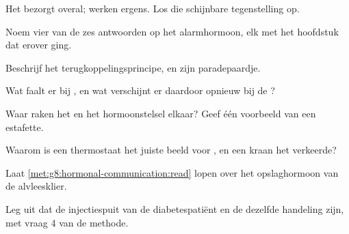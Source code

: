 \begin{exercise}[$\star$]\label{exo:g8:hormonal-communication:2}
Het  bezorgt overal;  werken ergens. Los die schijnbare
tegenstelling op.
\end{exercise}

\begin{exercise}[$\star$]\label{exo:g8:hormonal-communication:3}
Noem vier van de zes antwoorden op het alarmhormoon, elk met het
hoofdstuk dat erover ging.
\end{exercise}

\begin{exercise}[$\star$]\label{exo:g8:hormonal-communication:4}
Beschrijf het terugkoppelingsprincipe, en zijn paradepaardje.
\end{exercise}

\begin{exercise}[$\star$]\label{exo:g8:hormonal-communication:5}
Wat faalt er bij , en wat verschijnt er daardoor opnieuw bij de
?
\end{exercise}

\begin{exercise}[$\star$]\label{exo:g8:hormonal-communication:6}
Waar raken het  en het hormoonstelsel elkaar? Geef één
voorbeeld van een estafette.
\end{exercise}

\begin{exercise}[$\star\star$]\label{exo:g8:hormonal-communication:7}
Waarom is een thermostaat het juiste beeld voor , en een
kraan het verkeerde?
\end{exercise}

\begin{exercise}[$\star\star$]\label{exo:g8:hormonal-communication:8}
Laat \cref{met:g8:hormonal-communication:read} lopen over het
opslaghormoon van de alvleesklier.
\end{exercise}

\begin{exercise}[$\star\star$]\label{exo:g8:hormonal-communication:9}
Leg uit dat de injectiespuit van de diabetespatiënt en de 
dezelfde  handeling zijn, met vraag 4 van de methode.
\end{exercise}

